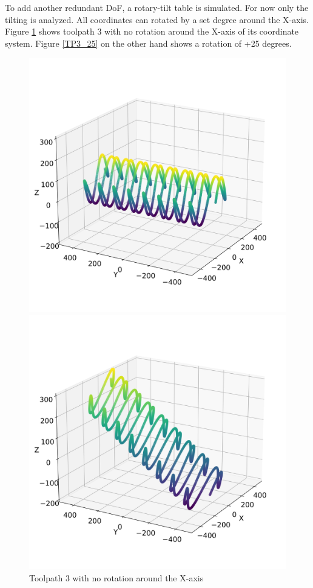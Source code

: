 To add another redundant DoF, a rotary-tilt table is simulated. For now only the tilting is analyzed. All coordinates can rotated by a set degree around the X-axis. Figure \ref{TP3_0} shows toolpath 3 with no rotation around the X-axis of its coordinate system. Figure \ref{TP3_25} on the other hand shows a rotation of +25 degrees.
\begin{figure}[H]%
	\centering
	\begin{minipage}{0.5\textwidth}
		\includegraphics[width=\textwidth]{figures/path3_kipp_0.png}
		\caption{Toolpath 3 with no rotation around the X-axis}
		\label{TP3_0}
	\end{minipage}\hfill
	\begin{minipage}{0.5\textwidth}
		\includegraphics[width=\textwidth]{figures/path3_kipp_25.png}

\end{minipage}
\end{figure}
